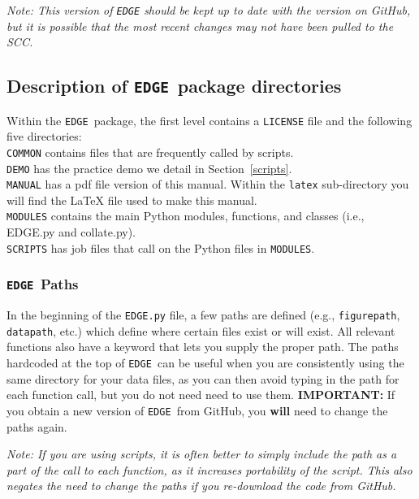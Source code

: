 \documentclass{article}
\newcommand{\edge}{\texttt{EDGE }}
\begin{document}
\vspace{2mm}
\noindent \textit{Note: This version of \texttt{EDGE} should be kept up to date with the version on GitHub, but it is possible that the most recent changes may not have been pulled to the SCC.} 

\subsection{Description of \edge package directories} \label{edgepackage}

Within the \edge package, the first level contains a \texttt{LICENSE} file and the following five directories:\\

\noindent \texttt{COMMON} contains files that are frequently called by scripts.
\\
\noindent \texttt{DEMO} has the practice demo we detail in Section~\ref{scripts}.
\\
\noindent \texttt{MANUAL} has a pdf file version of this manual.  Within the \texttt{latex} sub-directory you will find the LaTeX file used to make this manual.
\\
\noindent \texttt{MODULES} contains the main Python modules, functions, and classes (i.e., EDGE.py and collate.py).
\\
\noindent \texttt{SCRIPTS} has job files that call on the Python files in \texttt{MODULES}.


\subsubsection{\edge Paths} \label{paths}
In the beginning of the \texttt{EDGE.py} file, a few paths are defined (e.g., \texttt{figurepath}, \texttt{datapath}, etc.) which define where certain files exist or will exist. All relevant functions also have a keyword that lets you supply the proper path. The paths hardcoded at the top of \edge can be useful when you are consistently using the same directory for your data files, as you can then avoid typing in the path for each function call, but you do not need need to use them. \textbf{IMPORTANT:} If you obtain a new version of \edge from GitHub, you \textbf{will} need to change the paths again. 

\noindent \textit{Note: If you are using scripts, it is often better to simply include the path as a part of the call to each function, as it increases portability of the script. This also negates the need to change the paths if you re-download the code from GitHub.}
\end{document}
